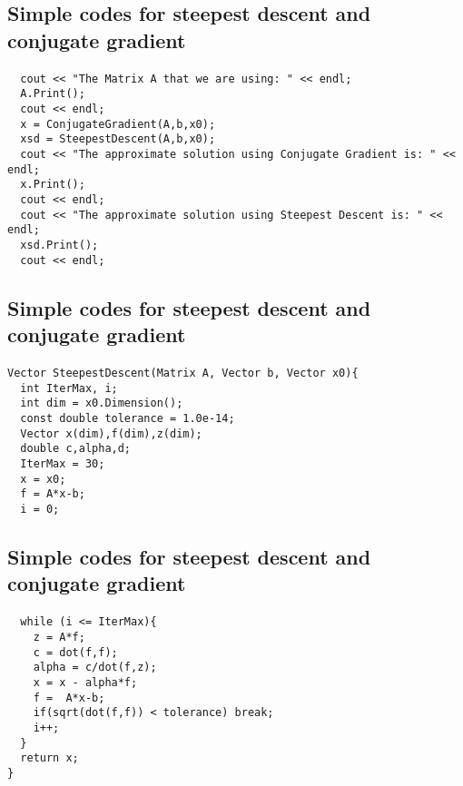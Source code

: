 \documentclass[%
twoside,                 %
final,                   %
10pt]{article}
\begin{document}
\subsection*{Simple codes for  steepest descent and conjugate gradient}

\paragraph{}
\begin{verbatim}
  cout << "The Matrix A that we are using: " << endl;
  A.Print();
  cout << endl;
  x = ConjugateGradient(A,b,x0);
  xsd = SteepestDescent(A,b,x0);
  cout << "The approximate solution using Conjugate Gradient is: " << endl;
  x.Print();
  cout << endl;
  cout << "The approximate solution using Steepest Descent is: " << endl;
  xsd.Print();
  cout << endl;
\end{verbatim}



\subsection*{Simple codes for  steepest descent and conjugate gradient}

\paragraph{}
\begin{verbatim}
Vector SteepestDescent(Matrix A, Vector b, Vector x0){
  int IterMax, i;
  int dim = x0.Dimension();
  const double tolerance = 1.0e-14;
  Vector x(dim),f(dim),z(dim);
  double c,alpha,d;
  IterMax = 30;
  x = x0;
  f = A*x-b;
  i = 0;
\end{verbatim}




\subsection*{Simple codes for  steepest descent and conjugate gradient}

\paragraph{}
\begin{verbatim}
  while (i <= IterMax){
    z = A*f;
    c = dot(f,f);
    alpha = c/dot(f,z);
    x = x - alpha*f;
    f =  A*x-b;
    if(sqrt(dot(f,f)) < tolerance) break;
    i++;
  }
  return x;
} 
\end{verbatim}
\end{document}
